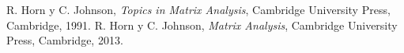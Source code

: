\begin{thebibliography}{99}
{%
\vspace{-0.1cm}
 R. Horn y C. Johnson, \emph{Topics in Matrix Analysis},
Cambridge University Press, Cambridge, 1991.
\vspace{-0.1cm}
 R. Horn y C. Johnson, \emph{Matrix Analysis}, Cambridge
University Press, Cambridge, 2013.

}
\end{thebibliography}